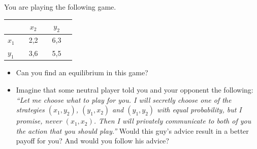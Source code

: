 \documentclass{ape}
\begin{document}
\nosolution

\section{}
You are playing the following game.

\begin{center}
\begin{tabular}[h!]{l|ccccc}
	&& \Large{$x_2$} && \Large{$y_2$} & \\
	\hline
	\Large{$x_1$} && \Large{2,2} && \Large{6,3} & \\
	\Large{$y_1$} && \Large{3,6} && \Large{5,5} & 
\end{tabular} 
\end{center}

\begin{itemize}
\item Can you find an equilibrium in this game?
\item Imagine that some neutral player told you and your opponent the following: \emph{``Let me choose what to play for you. I will secretly choose one of the strategies $(x_1, y_2)$, $(y_1, x_2)$ and $(y_1, y_2)$ with equal probability, but I promise,  never $(x_1, x_2)$. Then I will privately communicate to both of you the action that you should play.''} Would this guy's advice result in a better payoff for you? And would you follow his advice?
\end{itemize}


\nosolution
\end{document}
